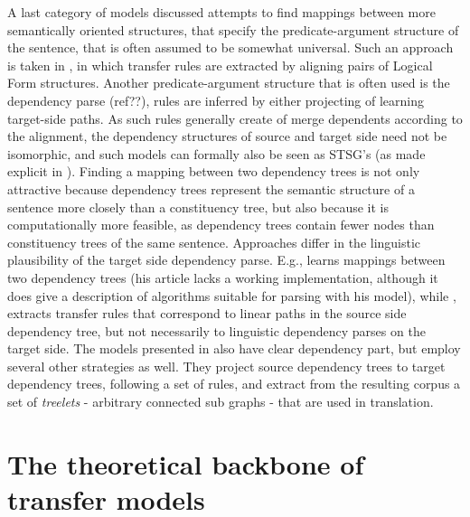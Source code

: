 \documentclass{report}
\theoremstyle{definition}
\theoremstyle{plain}
\begin{document}
A last category of models discussed attempts to find mappings between more semantically oriented structures, that specify the predicate-argument structure of the sentence, that is often assumed to be somewhat universal. Such an approach is taken in \cite{menezes2003best}, in which transfer rules are extracted by aligning pairs of Logical Form structures. Another predicate-argument structure that is often used is the dependency parse (ref??), rules are inferred by either projecting of learning target-side paths. As such rules generally create of merge dependents according to the alignment, the dependency structures of source and target side need not be isomorphic, and such models can formally also be seen as STSG's (as made explicit in \cite{eisner2003learning}). Finding a mapping between two dependency trees is not only attractive because dependency trees represent the semantic structure of a sentence more closely than a constituency tree, but also because it is computationally more feasible, as dependency trees contain fewer nodes than constituency trees of the same sentence. Approaches differ in the linguistic plausibility of the target side dependency parse. E.g., \cite{eisner2003learning} learns mappings between two dependency trees (his article lacks a working implementation, although it does give a description of algorithms suitable for parsing with his model), while  \cite{lin2004path}, extracts transfer rules that correspond to linear paths in the source side dependency tree, but not necessarily to linguistic dependency parses on the target side. The models presented in \cite{quirk2005dependency,quirk2006dependency,quirk2006we} also have clear dependency part, but employ several other strategies as well. They project source dependency trees to target dependency trees, following a set of rules, and extract from the resulting corpus a set of \textit{treelets} - arbitrary connected sub graphs - that are used in translation.



%
%

\chapter{The theoretical backbone of transfer models}
\end{document}
